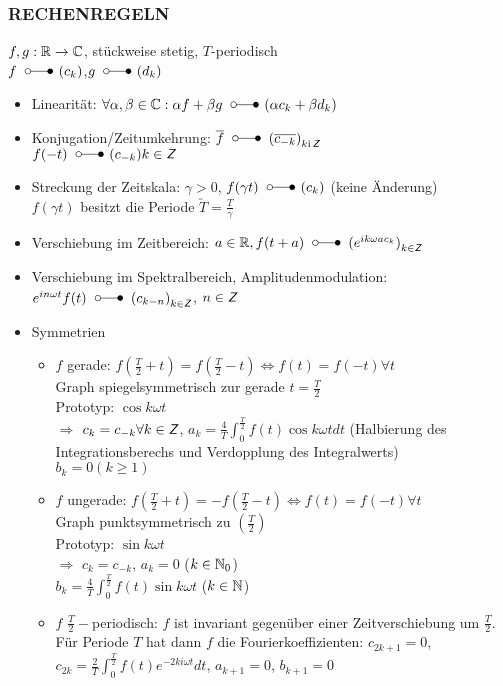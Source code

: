 \documentclass[nocolor,german]{latex4ei/latex4ei_sheet}
\DeclareMathOperator{\T}{\overset{\scriptscriptstyle\mathcal{}}{\ftsymbol}}						%
\begin{document}
\subsubsection*{RECHENREGELN}
	$f,g: \operatorname{\mathbb R} \to \mathbb C$, st\"uckweise stetig, $T$-periodisch\\
	$f \T (c_k)$,$g \T (d_k)$
	\begin{itemize}
		\item Linearit\"at: $\forall \alpha,\beta \in \C: \alpha f + \beta g \T (\alpha c_k + \beta d_k)$
		\item Konjugation/Zeitumkehrung: $\overline{f} \T {(\overline{c_{-k}})}_{k \i \Z}$\\
			$f(-t)\T(c_{-k}){k\in\Z}$
		\item Streckung der Zeitskala: $\gamma>0$, $f(\gamma t) \T (c_k)$ (keine \"Anderung)\\
			$f(\gamma t)$ besitzt die Periode $\utilde{T}=\frac{T}{\gamma}$\\
		\item Verschiebung im Zeitbereich: $a \in \R, f(t+a) \T {(e^{i k \omega a c_k})}_{k \in\Z}$
		\item Verschiebung im Spektralbereich, Amplitudenmodulation: $e^{i n \omega t} f(t) \T {(c_{k-n})}_{k \in\Z}$, $n \in \operatorname{\textsf{\textit{Z}}}$
		\item Symmetrien
			\begin{itemize}
				\item $f$ gerade: $f(\frac{T}{2}+t)=f(\frac{T}{2}-t) \Leftrightarrow f(t)=f(-t) \forall t$\\
					Graph spiegelsymmetrisch zur gerade $t=\frac{T}{2}$\\
					Prototyp: $\cos{k \omega t}$\\
					$\Rightarrow$ $c_k=c_{-k} \forall k \in \operatorname{\textsf{\textit{Z}}}$, $a_k=\frac{4}{T} \int_0^{\frac{T}{2}} f(t)\cos{k \omega t} d t$ (Halbierung des Integrationsberechs und Verdopplung des Integralwerts)\\
					$b_k=0 (k \ge 1)$
				\item $f$ ungerade: $f(\frac{T}{2}+t)=-f(\frac{T}{2}-t) \Leftrightarrow f(t)=f(-t) \forall t$\\
					Graph punktsymmetrisch zu $(\frac{T}{2})$\\
					Prototyp: $\sin{k \omega t}$\\
					$\Rightarrow$ $c_k=c_{-k}$, $a_k=0$ ($k \in \operatorname{\mathbb N}_0$)\\
					$b_k=\frac{4}{T} \int_0^{\frac{T}{2}} f(t) \sin{k \omega t}$ ($k \in \operatorname{\mathbb N}$)
				\item $f$ $\frac{T}{2}-$periodisch: $f$ ist invariant gegen\"uber einer Zeitverschiebung um $\frac{T}{2}$. F\"ur Periode $T$ hat dann $f$ die Fourierkoeffizienten: $c_{2 k+1}=0$, $c_{2 k}=\frac{2}{T} \int_0^\frac{T}{2} f(t) e^{-2 k i \omega t} d t$, $a_{k+1}=0$, $b_{k+1}=0$\\

\end{itemize}
\end{itemize}
\end{document}
